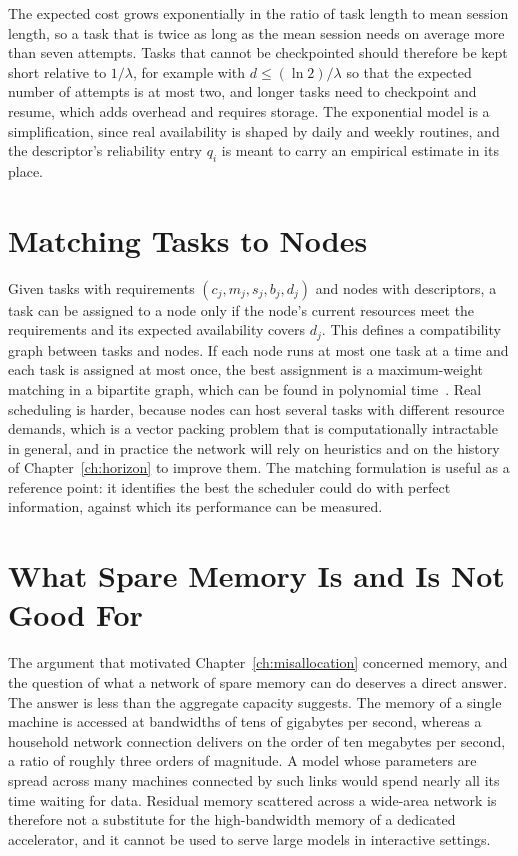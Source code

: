 The expected cost grows exponentially in the ratio of task length to mean session length, so a task that is twice as long as the mean session needs on average more than seven attempts. Tasks that cannot be checkpointed should therefore be kept short relative to $1/\lambda$, for example with $d\le(\ln 2)/\lambda$ so that the expected number of attempts is at most two, and longer tasks need to checkpoint and resume, which adds overhead and requires storage. The exponential model is a simplification, since real availability is shaped by daily and weekly routines, and the descriptor's reliability entry $q_i$ is meant to carry an empirical estimate in its place.

\section{Matching Tasks to Nodes}

Given tasks with requirements $(c_j,m_j,s_j,b_j,d_j)$ and nodes with descriptors, a task can be assigned to a node only if the node's current resources meet the requirements and its expected availability covers $d_j$. This defines a compatibility graph between tasks and nodes. If each node runs at most one task at a time and each task is assigned at most once, the best assignment is a maximum-weight matching in a bipartite graph, which can be found in polynomial time~\cite{kuhn1955}. Real scheduling is harder, because nodes can host several tasks with different resource demands, which is a vector packing problem that is computationally intractable in general, and in practice the network will rely on heuristics and on the history of Chapter~\ref{ch:horizon} to improve them. The matching formulation is useful as a reference point: it identifies the best the scheduler could do with perfect information, against which its performance can be measured.

\section{What Spare Memory Is and Is Not Good For}

The argument that motivated Chapter~\ref{ch:misallocation} concerned memory, and the question of what a network of spare memory can do deserves a direct answer. The answer is less than the aggregate capacity suggests. The memory of a single machine is accessed at bandwidths of tens of gigabytes per second, whereas a household network connection delivers on the order of ten megabytes per second, a ratio of roughly three orders of magnitude. A model whose parameters are spread across many machines connected by such links would spend nearly all its time waiting for data. Residual memory scattered across a wide-area network is therefore not a substitute for the high-bandwidth memory of a dedicated accelerator, and it cannot be used to serve large models in interactive settings.

